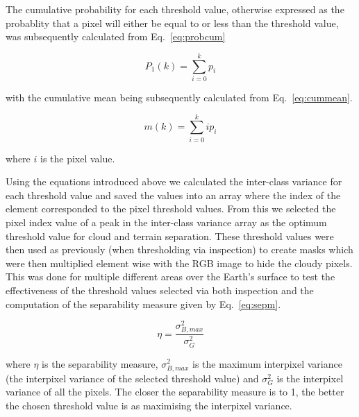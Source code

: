 \par
The cumulative probability for each threshold value, otherwise expressed as the probablity that a pixel will either be equal to or less than the threshold value, was subsequently calculated from Eq.~\ref{eq:probcum}

\begin{equation}\label{eq:probcum}
P_{1}(k)=\sum_{i=0}^{k} p_{i}
\end{equation}


with the cumulative mean being subsequently calculated from Eq.~\ref{eq:cummean}.

\begin{equation}\label{eq:cummean}
m(k)=\sum_{i=0}^{k} i p_{i}
\end{equation}


where $i$ is the pixel value.

Using the equations introduced above we calculated the inter-class variance for each threshold value and saved the values into an array where the index of the element corresponded to the pixel threshold values. From this we selected the pixel index value of a peak in the inter-class variance array as the optimum threshold value for cloud and terrain separation. These threshold values were then used as previously (when thresholding via inspection) to create masks which were then multiplied element wise with the RGB image to hide the cloudy pixels.
This was done for multiple different areas over the Earth's surface to test the effectiveness of the threshold values selected via both inspection and the computation of the separability measure given by Eq.~\ref{eq:sepm}.

\begin{equation}\label{eq:sepm}
    \eta = \frac{\sigma_{B,max}^{2}}{\sigma_{G}^{2}}
\end{equation}


where $\eta$ is the separability measure, $\sigma_{B,max}^{2}$ is the maximum interpixel variance (the interpixel variance of the selected threshold value) and $\sigma_{G}^{2}$ is the interpixel variance of all the pixels. The closer the separability measure is to 1, the better the chosen threshold value is as maximising the interpixel variance.

